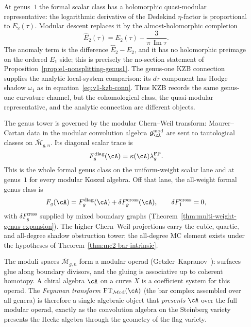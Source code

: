 \begin{remark}
\label{rem:genus-one-anomaly-kzb-comparison}
At genus~$1$ the formal scalar class has a holomorphic
quasi-modular representative: the logarithmic derivative of the
Dedekind $\eta$-factor is proportional to $E_2(\tau)$.  Modular descent
replaces it by the almost-holomorphic completion
\[
\widehat E_2(\tau)=E_2(\tau)-\frac{3}{\pi\,\operatorname{Im}\tau}.
\]
The anomaly term is the difference
$\widehat E_2-E_2$, and it has no holomorphic preimage on the ordered
$E_1$ side; this is precisely the no-section statement of
Proposition~\ref{prop:e1-nonsplitting-genus1}.  The genus-one KZB
connection supplies the analytic local-system comparison: its
$d\tau$ component has Hodge shadow $\omega_1$ as in
equation~\ref{eq:v1-kzb-conn}.  Thus KZB records the same genus-one
curvature channel, but the cohomological class, the quasi-modular
representative, and the analytic connection are different objects.
\end{remark}

The genus tower is governed by the modular Chern--Weil transform:
Maurer--Cartan data in the modular convolution algebra
$\mathfrak{g}_\cA^{\mathrm{mod}}$ are sent to tautological classes on
$\overline{\mathcal{M}}_{g,n}$. Its diagonal scalar trace is
\[
F_g^{\mathrm{diag}}(\cA)
=\kappa(\cA)\lambda_g^{\mathrm{FP}}.
\]
This is the whole formal genus class on the uniform-weight scalar lane
and at genus~$1$ for every modular Koszul algebra. Off that lane, the
all-weight formal genus class is
\[
F_g(\cA)=F_g^{\mathrm{diag}}(\cA)
+\delta F_g^{\mathrm{cross}}(\cA),
\qquad
\delta F_1^{\mathrm{cross}}=0,
\]
with $\delta F_g^{\mathrm{cross}}$ supplied by mixed boundary graphs
(Theorem~\ref{thm:multi-weight-genus-expansion}). The higher
Chern--Weil projections carry the cubic, quartic, and all-degree
shadow obstruction tower; the all-degree MC element exists under the
hypotheses of Theorem~\ref{thm:mc2-bar-intrinsic}.

The moduli spaces $\overline{\mathcal{M}}_{g,n}$ form a modular
operad (Getzler--Kapranov~\cite{GeK98}): surfaces glue along
boundary divisors, and the gluing is associative up to coherent
homotopy. A chiral algebra $\cA$ on a curve $X$ is a coefficient
system for this operad. The \emph{Feynman transform}
$\mathrm{FT}_{\mathcal{M}\mathrm{od}}(\cA)$ (the bar complex
assembled over all genera) is therefore a single algebraic
object that \emph{presents} $\cA$ over the full modular operad,
exactly as the convolution algebra on the Steinberg variety
presents the Hecke algebra through the geometry of the
flag variety.

